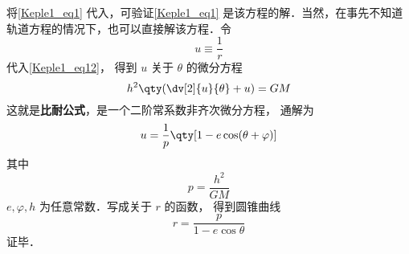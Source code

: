 将\autoref{Keple1_eq1} 代入，可验证\autoref{Keple1_eq1} 是该方程的解．当然，在事先不知道轨道方程的情况下，也可以直接解该方程．令
\begin{equation}\label{Keple1_eq13}
u \equiv \frac{1}{r}
\end{equation}
代入\autoref{Keple1_eq12}，  得到 $u$ 关于 $\theta $ 的微分方程
\begin{equation}\label{Keple1_eq15}
h^2 \qty( \dv[2]{u}{\theta} + u ) =  GM
\end{equation}
这就是\textbf{比耐公式}，是一个二阶常系数非齐次微分方程， 通解为
\begin{equation}
u = \frac{1}{p} \qty[1 - e\cos(\theta  + \varphi)]
\end{equation}
其中
\begin{equation}
p = \frac{h^2}{GM}
\end{equation}
$e, \varphi, h$ 为任意常数．写成关于 $r$ 的函数， 得到圆锥曲线
\begin{equation}\label{Keple1_eq16}
r = \frac{p}{1 - e \cos \theta }
\end{equation}
证毕．

